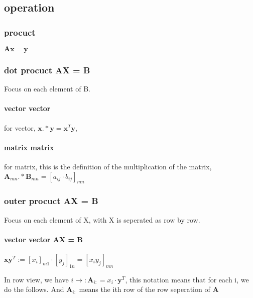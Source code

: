 \documentclass[UTF8]{../../09-Mathematics}
\begin{document}
\subsection{operation}


\subsubsection{procuct }

$ \boldsymbol A \boldsymbol x =\boldsymbol y$



\subsubsection{dot procuct AX = B}

Focus on each element of B.

\paragraph{vector vector}

for vector, $\boldsymbol x  . * \boldsymbol y  = \boldsymbol x^T \boldsymbol y$, 



\paragraph{matrix matrix}

for matrix, this is the definition of the multiplication of the matrix, $\boldsymbol A_{mn}  . * \boldsymbol B_{mn}  = [a_{ij} \cdot b_{ij} ]_{mn}$



\subsubsection{outer procuct AX = B}

Focus on each element of X, with X is seperated as row by row.

\paragraph{vector vector AX = B}

$\boldsymbol x \boldsymbol y^T := [x_i]_{m1} \cdot  [y_j]_{1n} =[x_i y_j]_{mn}   $

In row view, we have $i \rightarrow : \boldsymbol A _{i:} = x_i \cdot \boldsymbol y^T$, this notation means that for each i, we do the follows. And $ \boldsymbol A _{i:}$ means the ith row of the row seperation of $ \boldsymbol A$
\end{document}
